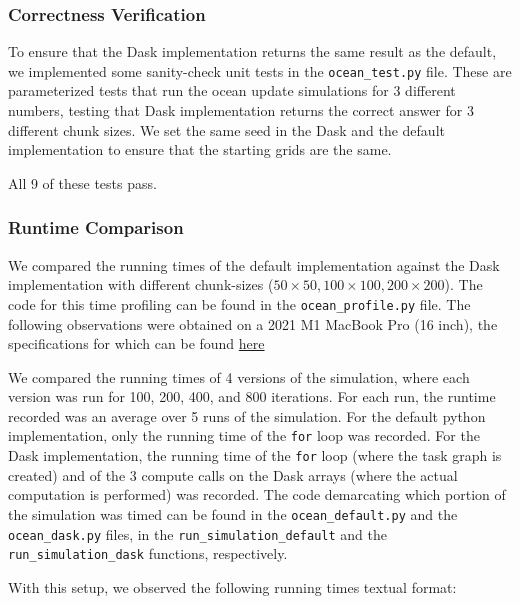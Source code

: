 \documentclass[a4paper,12pt]{article}
\begin{document}
\subsubsection{Correctness Verification}
To ensure that the Dask implementation returns the same result as the default, we implemented some sanity-check unit tests in the \verb|ocean_test.py| file. These are parameterized tests that run the ocean update simulations for 3 different numbers, testing that Dask implementation returns the correct answer for 3 different chunk sizes. We set the same seed in the Dask and the default implementation to ensure that the starting grids are the same. 

All 9 of these tests pass.

\subsubsection{Runtime Comparison}
We compared the running times of the default implementation against the Dask implementation with different chunk-sizes ($50 \times 50, 100 \times 100, 200 \times 200$). The code for this time profiling can be found in the \verb|ocean_profile.py| file. The following observations were obtained on a 2021 M1 MacBook Pro (16 inch), the specifications for which can be found \href{https://support.apple.com/en-us/111901}{here}

We compared the running times of 4 versions of the simulation, where each version was run for 100, 200, 400, and 800 iterations. For each run, the runtime recorded was an average over 5 runs of the simulation. For the default python implementation, only the running time of the \verb|for| loop was recorded. For the Dask implementation, the running time of the \verb|for| loop (where the task graph is created) and of the 3 compute calls on the Dask arrays (where the actual computation is performed) was recorded. The code demarcating which portion of the simulation was timed can be found in the \verb|ocean_default.py| and the \verb|ocean_dask.py| files, in the \verb|run_simulation_default| and the \verb|run_simulation_dask| functions, respectively.

With this setup, we observed the following running times textual format: 
\end{document}
